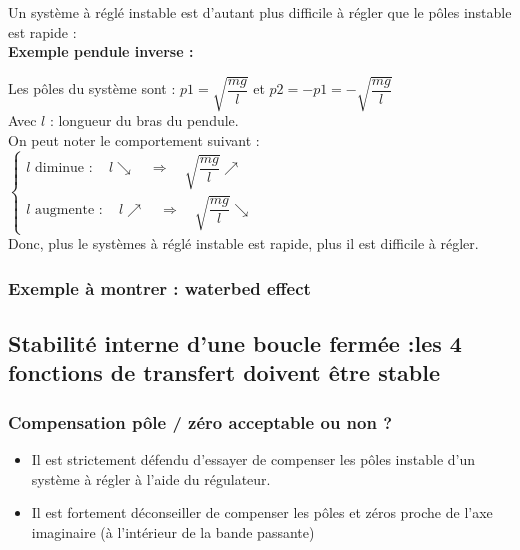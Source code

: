 \documentclass[document.tex]{subfiles}
\begin{document}

Un système à réglé instable est d'autant plus difficile à régler que le pôles instable est rapide :\\

\textbf{Exemple pendule inverse :}

Les pôles du système sont : $p1 =\sqrt{\dfrac{m g}{l}}$ et $p2 = -p1 = -\sqrt{\dfrac{m g}{l}}$ \\
Avec $l$ : longueur du bras du pendule.\\

On peut noter le comportement suivant : $ \begin{cases} l \text{ diminue } : \quad l \searrow \quad \Rightarrow \quad \sqrt{\dfrac{m g}{l}} \nearrow \\[12pt] 
l \text{ augmente } : \quad l \nearrow \quad \Rightarrow \quad \sqrt{\dfrac{m g}{l}} \searrow  \end{cases}$ \\

Donc, plus le systèmes à réglé instable est rapide, plus il est difficile à régler.

\subsubsection{Exemple à montrer : waterbed effect}


\subsection{Stabilité interne d'une boucle fermée :les 4 fonctions de transfert doivent être stable}

\subsubsection{Compensation pôle / zéro acceptable ou non ?}

\begin{itemize}
\item Il est strictement défendu d'essayer de compenser les pôles instable d'un système à régler à l'aide du régulateur.
\item Il est fortement déconseiller de compenser les pôles et zéros proche de l'axe imaginaire (à l'intérieur de la bande passante) 
\end{itemize}
\end{document}
